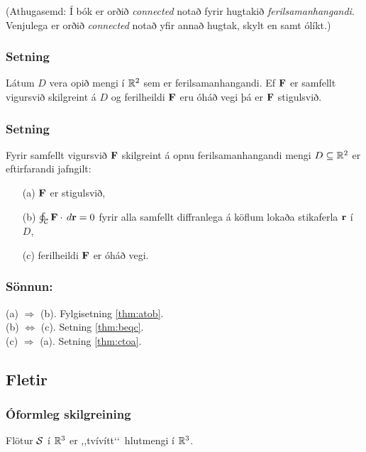 \bigskip
(Athugasemd:  Í bók er orðið {\em connected} notað fyrir hugtakið {\em
  ferilsamanhangandi}.  Venjulega er orðið {\em connected} notað yfir
  annað hugtak, skylt en samt ólíkt.)




\subsubsection{Setning  }
 Látum $D$ vera opið mengi í ${\mathbb R}^2$ sem er ferilsamanhangandi.  Ef $\mbox{${\bf F}$}$ er samfellt vigursvið skilgreint á $D$ og ferilheildi $\mbox{${\bf F}$}$ eru óháð vegi þá er $\mbox{${\bf F}$}$ stigulsvið.
    



\subsubsection{Setning \rtask{}}
 Fyrir samfellt vigursvið $\mbox{${\bf F}$}$ skilgreint á opnu 
ferilsamanhangandi mengi $D\subseteq {\mathbb R}^2$ er eftirfarandi jafngilt:
\begin{itemize}
 \item [(a)] $\mbox{${\bf F}$}$ er stigulsvið,
 \item [(b)]  $\oint_{\cal C} \mbox{${\bf F}$}\cdot\,d\mbox{${\bf r}$}=0$ fyrir alla samfellt diffranlega
á köflum lokaða stikaferla $\mbox{${\bf r}$}$ í $D$, 
\item [(c)] ferilheildi $\mbox{${\bf F}$}$ er óháð vegi.
\end{itemize}

\subsubsection{Sönnun: } 
(a) $\Rightarrow$ (b). Fylgisetning \ref{thm:atob}. \\
(b) $\Leftrightarrow$ (c). Setning \ref{thm:beqc}. \\
(c) $\Rightarrow$ (a). Setning \ref{thm:ctoa}.
 




\subsection{Fletir} 

\subsubsection{Óformleg skilgreining  \rtask{}}
Flötur $\cal S$ í ${\mathbb R}^3$ er
,,tvívítt\lq\lq\ hlutmengi í ${\mathbb R}^3$.   



